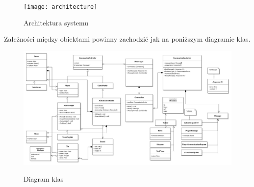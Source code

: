 \documentclass[11pt]{article}
\begin{document}
\begin{figure}[!h]
\caption{Architektura systemu}
\resizebox{\textwidth}{!}
{
\texttt{[image: architecture]}
}
\end{figure}
\FloatBarrier

\par
Zależności między obiektami powinny zachodzić jak na poniższym diagramie klas.

\begin{figure}
\caption{Diagram klas}
\hspace*{-4cm}
\resizebox{1.4\textheight}{!}
{
\includegraphics{class_diagram}
}
\end{figure}
\FloatBarrier
\end{document}
